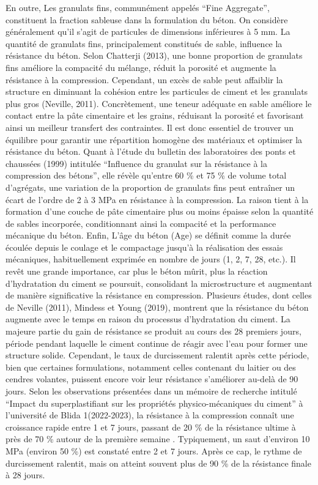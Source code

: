 \documentclass[
  12pt,
]{article}
\begin{document}
En outre, Les granulats fins, communément appelés ``Fine Aggregate'',
constituent la fraction sableuse dans la formulation du béton. On
considère généralement qu'il s'agit de particules de dimensions
inférieures à 5 mm. La quantité de granulats fins, principalement
constitués de sable, influence la résistance du béton. Selon Chatterji
(2013), une bonne proportion de granulats fins améliore la compacité du
mélange, réduit la porosité et augmente la résistance à la compression.
Cependant, un excès de sable peut affaiblir la structure en diminuant la
cohésion entre les particules de ciment et les granulats plus gros
(Neville, 2011). Concrètement, une teneur adéquate en sable améliore le
contact entre la pâte cimentaire et les grains, réduisant la porosité et
favorisant ainsi un meilleur transfert des contraintes. Il est donc
essentiel de trouver un équilibre pour garantir une répartition homogène
des matériaux et optimiser la résistance du béton. Quant à l'étude du
bulletin des laboratoires des ponts et chaussées (1999) intitulée
``Influence du granulat sur la résistance à la compression des bétons'',
elle révèle qu'entre 60 \% et 75 \% de volume total d'agrégats, une
variation de la proportion de granulats fins peut entraîner un écart de
l'ordre de 2 à 3 MPa en résistance à la compression. La raison tient à
la formation d'une couche de pâte cimentaire plus ou moins épaisse selon
la quantité de sables incorporée, conditionnant ainsi la compacité et la
performance mécanique du béton. Enfin, L'âge du béton (Age) se définit
comme la durée écoulée depuis le coulage et le compactage jusqu'à la
réalisation des essais mécaniques, habituellement exprimée en nombre de
jours (1, 2, 7, 28, etc.). Il revêt une grande importance, car plus le
béton mûrit, plus la réaction d'hydratation du ciment se poursuit,
consolidant la microstructure et augmentant de manière significative la
résistance en compression. Plusieurs études, dont celles de Neville
(2011), Mindess et Young (2019), montrent que la résistance du béton
augmente avec le temps en raison du processus d'hydratation du ciment.
La majeure partie du gain de résistance se produit au cours des 28
premiers jours, période pendant laquelle le ciment continue de réagir
avec l'eau pour former une structure solide. Cependant, le taux de
durcissement ralentit après cette période, bien que certaines
formulations, notamment celles contenant du laitier ou des cendres
volantes, puissent encore voir leur résistance s'améliorer au-delà de 90
jours. Selon les observations présentées dans un mémoire de recherche
intitulé ``Impact du superplastifiant sur les propriétés
physico-mécaniques du ciment'' à l'université de Blida 1(2022-2023), la
résistance à la compression connaît une croissance rapide entre 1 et 7
jours, passant de 20 \% de la résistance ultime à près de 70 \% autour
de la première semaine . Typiquement, un saut d'environ 10 MPa (environ
50 \%) est constaté entre 2 et 7 jours. Après ce cap, le rythme de
durcissement ralentit, mais on atteint souvent plus de 90 \% de la
résistance finale à 28 jours.
\end{document}
